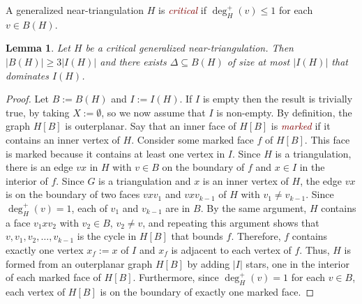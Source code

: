 \documentclass[12pt]{article}
\newtheorem{lem}{Lemma}
\newcommand{\defin}[1]{\emph{\textcolor{Maroon}{#1}}}
\begin{document}
A generalized near-triangulation $H$ is \defin{critical} if $\deg^+_H(v)\le 1$ for each $v\in B(H)$.


\begin{lem}\label{base_case}
    Let $H$ be a critical generalized near-triangulation. Then $|B(H)|\ge 3|I(H)|$ and there exists $\Delta\subseteq B(H)$ of size at most $|I(H)|$ that dominates $I(H)$.
\end{lem}

\begin{proof}
  Let $B:=B(H)$ and $I:=I(H)$.  If $I$ is empty then the result is trivially true, by taking $X:=\emptyset$, so we now assume that $I$ is non-empty.  By definition, the graph $H[B]$ is outerplanar.  Say that an inner face of $H[B]$ is \defin{marked} if it contains an inner vertex of $H$.  Consider some marked face $f$ of $H[B]$.  This face is marked because it contains at least one vertex in $I$.  Since $H$ is a triangulation, there is an edge $vx$ in $H$ with $v\in B$ on the boundary of $f$ and $x\in I$ in the interior of $f$. Since $G$ is a triangulation and $x$ is an inner vertex of $H$, the edge $vx$ is on the boundary of two faces $vxv_1$ and $vxv_{k-1}$ of $H$ with $v_1\neq v_{k-1}$.  Since $\deg^+_H(v)=1$, each of $v_1$ and $v_{k-1}$ are in $B$.  By the same argument, $H$ contains a face $v_1xv_2$ with $v_2\in B$, $v_2\neq v$, and repeating this argument shows that $v,v_1,v_2,\ldots,v_{k-1}$ is the cycle in $H[B]$ that bounds $f$.  Therefore, $f$ contains exactly one vertex $x_f:=x$ of $I$ and $x_f$ is adjacent to each vertex of $f$.  Thus, $H$ is formed from an outerplanar graph $H[B]$ by adding $|I|$ stars, one in the interior of each marked face of $H[B]$.  Furthermore, since $\deg_H^+(v)=1$ for each $v\in B$, each vertex of $H[B]$ is on the boundary of exactly one marked face.


\end{proof}
\end{document}
